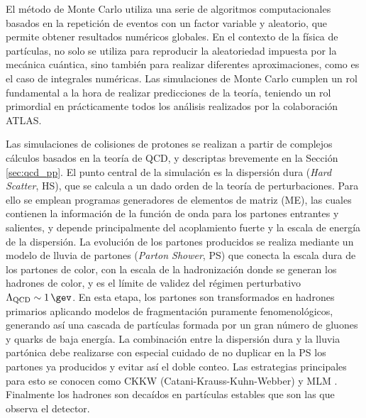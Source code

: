 El método de Monte Carlo utiliza una serie de algoritmos computacionales basados en la repetición de eventos con un factor variable y aleatorio, que permite obtener resultados numéricos globales.
En el contexto de la física de partículas, no solo se utiliza para reproducir la aleatoriedad impuesta por la mecánica cuántica, sino también para realizar diferentes aproximaciones, como es el caso de integrales numéricas.
Las simulaciones de Monte Carlo cumplen un rol fundamental a la hora de realizar predicciones de la teoría, teniendo un rol primordial en prácticamente todos los análisis realizados por la colaboración ATLAS. 

Las simulaciones de colisiones de protones se realizan a partir de complejos cálculos basados en la teoría de QCD, y descriptas brevemente en la Sección \ref{sec:qcd_pp}. 
El punto central de la simulación es la dispersión dura (\textit{Hard Scatter}, HS), que se calcula a un dado orden de la teoría de perturbaciones. Para ello se emplean programas generadores de elementos de matriz (ME), las cuales contienen la información de la función de onda para los partones entrantes y salientes, y depende principalmente del acoplamiento
fuerte y la escala de energía de la dispersión. La evolución de los partones producidos se realiza mediante un modelo de lluvia de partones (\textit{Parton Shower}, PS) que conecta la escala dura de los partones de color, con la escala de la hadronización donde se generan los hadrones de color, y es el límite de validez del régimen perturbativo $\Lambda_{\text{QCD}}\sim 1\,\gev$. En esta etapa, los partones son transformados en hadrones primarios aplicando modelos de fragmentación puramente fenomenológicos, generando así una cascada de partículas formada por un gran número de gluones y quarks de baja energía. La combinación entre la dispersión dura y la lluvia partónica debe realizarse
con especial cuidado de no duplicar en la PS los partones ya producidos y evitar
así el doble conteo. Las estrategias principales para esto se conocen como CKKW
(Catani-Krauss-Kuhn-Webber) \cite{Catani_2001, Krauss_2002} y MLM \cite{Mangano_2003}. Finalmente los hadrones son decaídos en partículas estables que son las que observa el detector.

